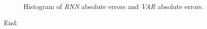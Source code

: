 \begin{figure}[bth] 
  \caption{Histogram of \textit{RNN} absolute errors and \textit{VAR}
absolute errors.}
  \label{fig:comparison-histogram-prediction-errors}
\end{figure}




End:
